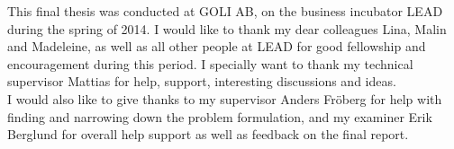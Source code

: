 This final thesis was conducted at GOLI AB, on the business incubator
LEAD during the spring of 2014. I would like to thank my dear colleagues
Lina, Malin and Madeleine, as well as all other people at LEAD for good
fellowship and encouragement during this period. I specially want to
thank my technical supervisor Mattias for help, support, interesting
discussions and ideas.\\

I would also like to give thanks to my supervisor Anders Fröberg for
help with finding and narrowing down the problem formulation, and my
examiner Erik Berglund for overall help support as well as feedback on
the final report.\\
